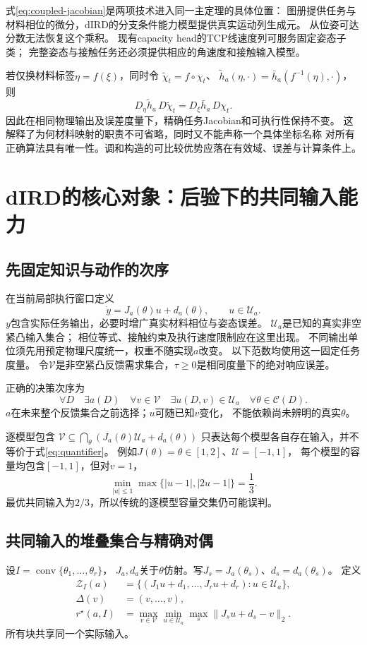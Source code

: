 \documentclass[11pt,a4paper]{article}
\numberwithin{equation}{section}
\theoremstyle{definition}
\newcommand{\U}{\mathcal U}
\newcommand{\V}{\mathcal V}
\newcommand{\C}{\mathcal C}
\DeclareMathOperator{\conv}{conv}
\begin{document}
式\eqref{eq:coupled-jacobian}是两项技术进入同一主定理的具体位置：
图册提供任务与材料相位的微分，dIRD的分支条件能力模型提供真实运动列生成元。
从位姿可达分数无法恢复这个乘积。
现有capacity head的TCP线速度列可服务固定姿态子类；
完整姿态与接触任务还必须提供相应的角速度和接触输入模型。

若仅换材料标签$\eta=f(\xi)$，同时令
$\widetilde\chi_t=f\circ\chi_t$、
$\widetilde h_a(\eta,\cdot)=\bar h_a(f^{-1}(\eta),\cdot)$，则
\[
 D_\eta\widetilde h_a\,D\widetilde\chi_t
 =D_\xi\bar h_a\,D\chi_t.
\]
因此在相同物理输出及误差度量下，精确任务Jacobian和可执行性保持不变。
这解释了为何材料映射的职责不可省略，同时又不能声称一个具体坐标名称
对所有正确算法具有唯一性。调和构造的可比较优势应落在有效域、误差与计算条件上。

\section{dIRD的核心对象：后验下的共同输入能力}
\subsection{先固定知识与动作的次序}
在当前局部执行窗口定义
\begin{equation}
 \dot y=J_a(\theta)u+d_a(\theta),\qquad u\in\U_a.
 \label{eq:response}
\end{equation}
$y$包含实际任务输出，必要时增广真实材料相位与姿态误差。
$\U_a$是已知的真实非空紧凸输入集合；
相位等式、接触约束及执行速度限制应在这里出现。
不同输出单位须先用预定物理尺度统一，权重不随实现$a$改变。
以下范数均使用这一固定任务度量。
令$\V$是非空紧凸反馈需求集合，$\tau\ge0$是相同度量下的绝对响应误差。

正确的决策次序为
\begin{equation}
 \forall D\quad
 \exists a(D)\quad
 \forall v\in\V\quad
 \exists u(D,v)\in\U_a\quad
 \forall\theta\in\C(D).
 \label{eq:quantifier}
\end{equation}
$a$在未来整个反馈集合之前选择；$u$可随已知$v$变化，
不能依赖尚未辨明的真实$\theta$。

逐模型包含
$\V\subseteq\bigcap_\theta(J_a(\theta)\U_a+d_a(\theta))$
只表达每个模型各自存在输入，并不等价于式\eqref{eq:quantifier}。
例如$J(\theta)=\theta\in[1,2]$、$\U=[-1,1]$，
每个模型的容量均包含$[-1,1]$，但对$v=1$，
\[
 \min_{|u|\le1}\max\{|u-1|,|2u-1|\}=\frac13.
\]
最优共同输入为$2/3$，所以传统的逐模型容量交集仍可能误判。

\subsection{共同输入的堆叠集合与精确对偶}
设$I=\conv\{\theta_1,\ldots,\theta_r\}$，
$J_a,d_a$关于$\theta$仿射。写$J_s=J_a(\theta_s)$、$d_s=d_a(\theta_s)$。
定义
\begin{align}
 \mathcal Z_I(a)&=
 \{(J_1u+d_1,\ldots,J_ru+d_r):u\in\U_a\},\\
 \Delta(v)&=(v,\ldots,v),\\
 r^\star(a,I)&=
 \max_{v\in\V}\min_{u\in\U_a}\max_s\|J_su+d_s-v\|_2.
 \label{eq:risk}
\end{align}
所有块共享同一个实际输入。
\end{document}
